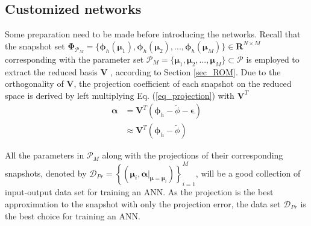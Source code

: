 \documentclass[preprint, 10pt]{elsarticle}
\begin{document}
\subsection{Customized networks}

Some preparation need to be made before introducing the networks. Recall that the snapshot set $\pmb {\Phi}_{\mathcal{P}_M}=\{\pmb{\phi}_h(\pmb{\mu}_1), \pmb{\phi}_h(\pmb{\mu}_2),...,\pmb{\phi}_h(\pmb{\mu}_M)\}  \in \mathbf{R}^{N \times M}$ corresponding with the parameter set $\mathcal{P}_M=\{\pmb{\mu}_1, \pmb{\mu}_2,...,\pmb{\mu}_M\} \subset \mathcal{P}$ is employed to extract the reduced basis $\mathbf{V}$ , according to Section \ref{sec_ROM}. Due to the orthogonality of $\mathbf{V}$, the projection coefficient of each snapshot on the reduced space is derived by left multiplying Eq. (\ref{eq_projection}) with $\mathbf{V}^T$
\begin{equation}
\begin{aligned}
\pmb{\alpha}  &   =    \mathbf{V}^T (\pmb{\phi}_h -\tilde{\phi} - \pmb{\epsilon}) \\
              &\approx \mathbf{V}^T (\pmb{\phi}_h -\tilde{\phi})
\end{aligned}
\label{eq_RBCoefficients}
\end{equation}

All the parameters in $\mathcal{P}_M$ along with the projections of their corresponding snapshots, denoted by $\mathcal{D}_{Pr}=\left\{\left(\pmb{\mu}_i, \left. {\pmb{\alpha}} \right|_{\pmb{\mu}=\pmb{\mu}_i}
\right) \right\}_{i=1}^{M}$,  will be a good collection of input-output data set for training an ANN. As the projection is the best approximation to the snapshot with only the projection error, the data set $\mathcal{D}_{Pr}$ is the best choice for training an ANN.
\end{document}
